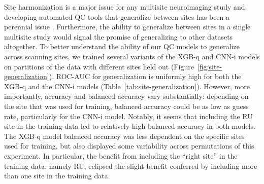 \documentclass[fleqn,10pt,inline]{wlscirep}
\begin{document}
Site harmonization is a major issue for any multisite neuroimaging study and developing automated QC tools that generalize between sites has been a perennial issue \cite{esteban2017mriqc}. Furthermore, the ability to generalize between sites in a single multisite study would signal the promise of generalizing to other datasets altogether. To better understand the ability of our QC models to generalize across scanning sites, we trained several variants of the XGB-q and CNN-i models on partitions of the data with different sites held out (Figure~\ref{fig:site-generalization}). ROC-AUC for generalization is uniformly high for both the XGB-q and the CNN-i models (Table~\ref{tab:site-generalization}). However, more importantly, accuracy and balanced accuracy vary substantially: depending on the site that was used for training, balanced accuracy could be as low as guess rate, particularly for the CNN-i model. Notably, it seems that including the RU site in the training data led to relatively high balanced accuracy in both models. The XGB-q model balanced accuracy was less dependent on the specific sites used for training, but also displayed some variability across permutations of this experiment. In particular, the benefit from including the ``right site'' in the training data, namely RU, eclipsed the slight benefit conferred by including more than one site in the training data.
\end{document}
